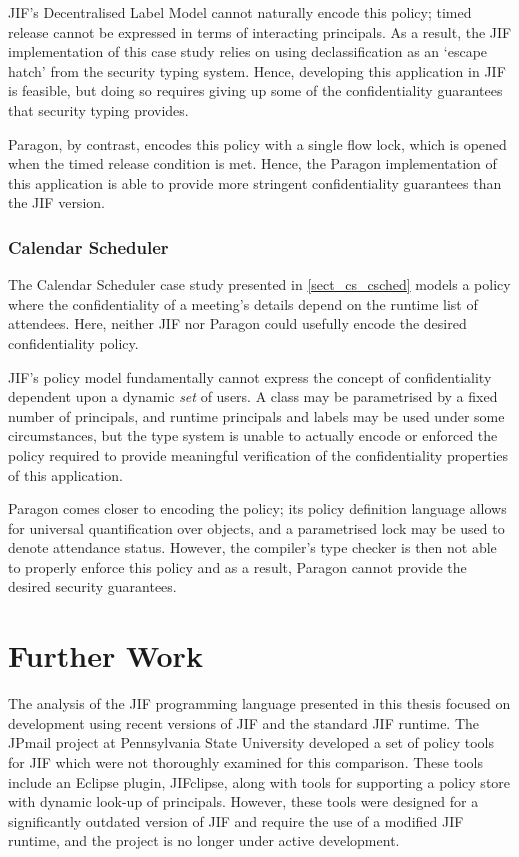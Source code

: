 JIF's Decentralised Label Model cannot naturally encode this policy; timed release cannot be expressed in terms of interacting principals. As a result, the JIF implementation of this case study relies on using declassification as an `escape hatch' from the security typing system. Hence, developing this application in JIF is feasible, but doing so requires giving up some of the confidentiality guarantees that security typing provides.

Paragon, by contrast, encodes this policy with a single flow lock, which is opened when the timed release condition is met. Hence, the Paragon implementation of this application is able to provide more stringent confidentiality guarantees than the JIF version.

\subsubsection{Calendar Scheduler}

The Calendar Scheduler case study presented in \ref{sect_cs_csched} models a policy where the confidentiality of a meeting's details depend on the runtime list of attendees. Here, neither JIF nor Paragon could usefully encode the desired confidentiality policy.

JIF's policy model fundamentally cannot express the concept of confidentiality dependent upon a dynamic \textit{set} of users. A class may be parametrised by a fixed number of principals, and runtime principals and labels may be used under some circumstances, but the type system is unable to actually encode or enforced the policy required to provide meaningful verification of the confidentiality properties of this application.

Paragon comes closer to encoding the policy; its policy definition language allows for universal quantification over objects, and a parametrised lock may be used to denote attendance status. However, the compiler's type checker is then not able to properly enforce this policy and as a result, Paragon cannot provide the desired security guarantees.

\section{Further Work}

The analysis of the JIF programming language presented in this thesis focused on development using recent versions of JIF and the standard JIF runtime. The JPmail project \cite{jpmailpage} at Pennsylvania State University developed a set of policy tools for JIF which were not thoroughly examined for this comparison. These tools include an Eclipse plugin, JIFclipse, along with tools for supporting a policy store with dynamic look-up of principals. However, these tools were designed for a significantly outdated version of JIF and require the use of a modified JIF runtime, and the project is no longer under active development.

